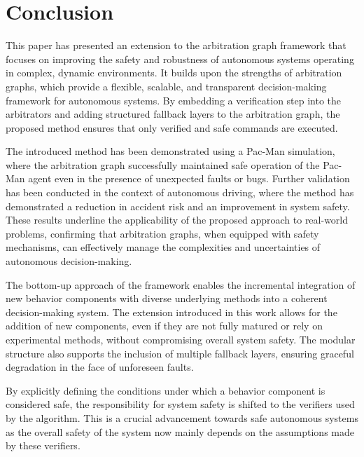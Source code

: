 \section{Conclusion}
This paper has presented an extension to the arbitration graph framework that focuses on improving the safety and robustness of autonomous systems operating in complex, dynamic environments.
It builds upon the strengths of arbitration graphs, which provide a flexible, scalable, and transparent decision-making framework for autonomous systems.
By embedding a verification step into the arbitrators and adding structured fallback layers to the arbitration graph,
the proposed method ensures that only verified and safe commands are executed.

The introduced method has been demonstrated using a Pac-Man simulation, where the arbitration graph successfully maintained safe operation of the Pac-Man agent even in the presence of unexpected faults or bugs.
Further validation has been conducted in the context of autonomous driving, where the method has demonstrated a reduction in accident risk and an improvement in system safety.
These results underline the applicability of the proposed approach to real-world problems,
confirming that arbitration graphs, when equipped with safety mechanisms,
can effectively manage the complexities and uncertainties of autonomous decision-making.

The bottom-up approach of the framework enables the incremental integration of new behavior components with diverse underlying methods into a coherent decision-making system.
The extension introduced in this work allows for the addition of new components, even if they are not fully matured or rely on experimental methods, without compromising overall system safety.
The modular structure also supports the inclusion of multiple fallback layers, ensuring graceful degradation in the face of unforeseen faults.

By explicitly defining the conditions under which a behavior component is considered safe,
the responsibility for system safety is shifted to the verifiers used by the algorithm.
This is a crucial advancement towards safe autonomous systems as
the overall safety of the system now mainly depends on the assumptions made by these verifiers.

